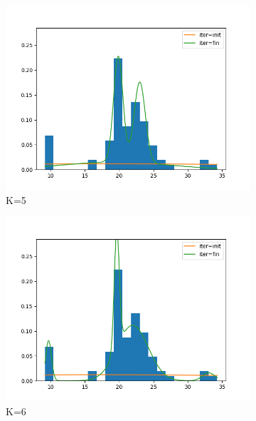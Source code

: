 \begin{figure}
     \hfill
     \begin{subfigure}[b]{0.3\textwidth}
         \centering
         \includegraphics[width=\textwidth]{../code/stochastic_loc_scale_plots/galaxies_hist_k_5.png}
         \caption{K=5}
         \label{fig:Stoch_loc_scale5}
     \end{subfigure}
     \hfill
     \begin{subfigure}[b]{0.3\textwidth}
         \centering
         \includegraphics[width=\textwidth]{../code/stochastic_loc_scale_plots/galaxies_hist_k_6.png}
         \caption{K=6}
         \label{fig:Stoch_loc_scale6}
     \end{subfigure}
     \begin{subfigure}[b]{0.3\textwidth}

\end{subfigure}
\end{figure}
